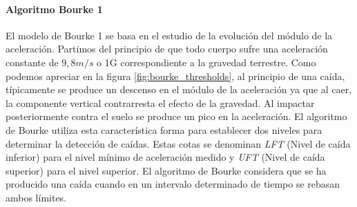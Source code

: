


\paragraph{Algoritmo Bourke 1} El modelo de Bourke 1\cite{Bourke2006} se basa en el estudio de la evolución del módulo de la aceleración. Partimos del principio de que todo cuerpo sufre una aceleración constante de $9,8m/s$ o 1G correspondiente a la gravedad terrestre. Como podemos apreciar en la figura \ref{fig:bourke_thresholds}, al principio de una caída, típicamente se produce un descenso en el módulo de la aceleración ya que al caer, la componente vertical contrarresta el efecto de la gravedad. Al impactar posteriormente contra el suelo se produce un pico en la aceleración. El algoritmo de Bourke utiliza esta característica forma para establecer dos niveles para determinar la detección de caídas. Estas cotas se denominan \textit{LFT} (Nivel de caída inferior) para el nivel mínimo de aceleración medido y \textit{UFT} (Nivel de caída superior) para el nivel superior. El algoritmo de Bourke considera que se ha producido una caída cuando en un intervalo determinado de tiempo se rebasan ambos límites. 

